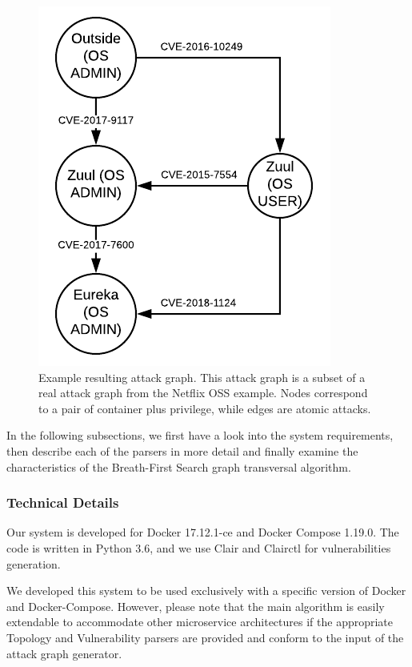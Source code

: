 \documentclass[letterpaper, 10 pt, conference]{ieeeconf}  %
\begin{document}
\begin{figure}
	\includegraphics[]{Attack_graph}
	\caption{Example resulting attack graph. This attack graph is a subset of a real attack graph from the Netflix OSS example. Nodes correspond to a pair of container plus privilege, while edges are atomic attacks.}
	\label{AttackGraph}
\end{figure}


In the following subsections, we first have a look into the system requirements, then describe each of the parsers in more detail and finally examine the characteristics of the Breath-First Search graph transversal algorithm.

\subsubsection{Technical Details}
Our system is developed for Docker 17.12.1-ce and Docker Compose 1.19.0. The code is written in Python 3.6, and we use Clair and Clairctl for vulnerabilities generation.

We developed this system to be used exclusively with a specific version of Docker and Docker-Compose. However, please note that the main algorithm is easily extendable to accommodate other microservice architectures if the appropriate Topology and Vulnerability parsers are provided and conform to the input of the attack graph generator.
\end{document}
